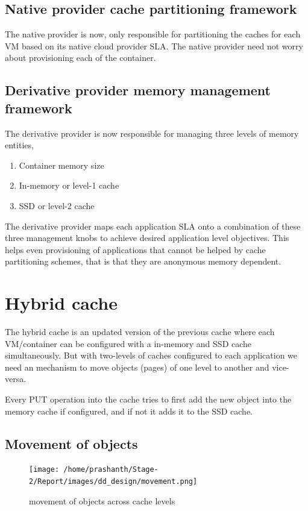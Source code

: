       \subsection{Native provider cache partitioning framework}
	The native provider is now, only responsible for partitioning the caches for each VM
	based on its native cloud provider SLA. The native provider need not worry about 
	provisioning each of the container.

      \subsection{Derivative provider memory management framework}	
	The derivative provider is now responsible for managing three levels of memory entities,
	
	\begin{enumerate}
	  \item Container memory size
	  \item In-memory or level-1 cache
	  \item SSD or level-2 cache
	\end{enumerate}
	
	The derivative provider maps each application SLA onto a combination of these three management
	knobs to achieve desired application level objectives. This helps even provisioning of applications
	that cannot be helped by cache partitioning schemes, that is that they are anonymous memory dependent.


    \section{Hybrid cache}
      The hybrid cache is an updated version of the previous cache where each VM/container can be configured
      with a in-memory and SSD cache simultaneously. But with two-levels of caches configured to each application
      we need an mechanism to move objects (pages) of one level to another and vice-versa.
      
      Every PUT operation into the cache tries to first add the new object into the memory cache if configured, 
      and if not it adds it to the SSD cache.
      
      \subsection{Movement of objects}	
      
	\begin{figure}
	  \centering
	  \texttt{[image: /home/prashanth/Stage-2/Report/images/dd\_design/movement.png]}
	  \caption{\dd{} movement of objects across cache levels}
	  \label{img:dd_movement}
	\end{figure}
	
